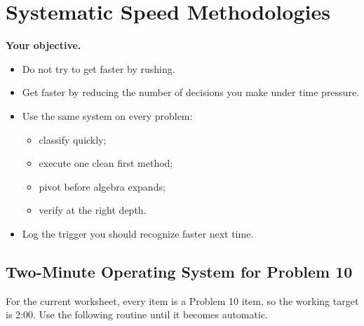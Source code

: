 \documentclass[11pt]{article}
\begin{document}
\section{Systematic Speed Methodologies}

\textbf{Your objective.}
\begin{itemize}
  \item Do not try to get faster by rushing.
  \item Get faster by reducing the number of decisions you make under time pressure.
  \item Use the same system on every problem:
    \begin{itemize}
      \item classify quickly;
      \item execute one clean first method;
      \item pivot before algebra expands;
      \item verify at the right depth.
    \end{itemize}
  \item Log the trigger you should recognize faster next time.
\end{itemize}

\subsection{Two-Minute Operating System for Problem 10}

For the current worksheet, every item is a Problem 10 item, so the working target is 2:00. Use the following routine until it becomes automatic.
\end{document}
